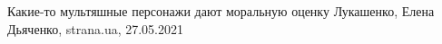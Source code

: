  
 
 
 
 
Какие-то мультяшные персонажи дают моральную оценку Лукашенко, Елена Дьяченко,
strana.ua, 27.05.2021
